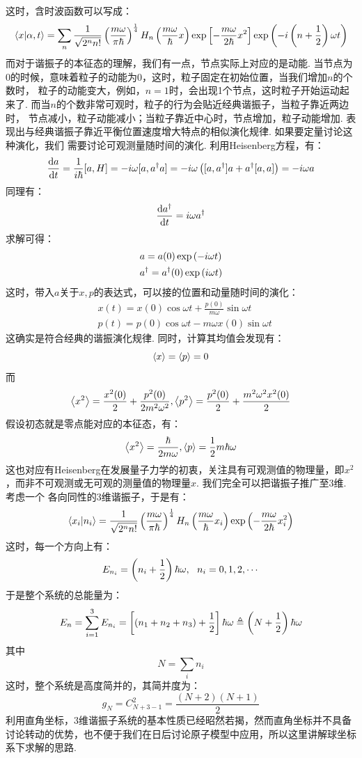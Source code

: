 这时，含时波函数可以写成：
\[
\bra{x}\ket{\alpha,t} = \sum_{n}\frac{1}{\sqrt{2^{n}n!}}\left({\frac{m\omega}{\pi\hbar}}\right)^{\frac{1}{4}}H_{n}\left({\frac{m\omega}{\hbar}x}\right)\exp\left[{-\frac{m\omega}{2\hbar}x^{2}}\right]\exp\left({-i\left({n+\frac{1}{2}}\right)\omega t}\right)
\]
而对于谐振子的本征态的理解，我们有一点，节点实际上对应的是动能. 当节点为0的时候，意味着粒子的动能为0，这时，粒子固定在初始位置，当我们增加\(n\)的个数时，
粒子的动能变大，例如，\(n=1\)时，会出现1个节点，这时粒子开始运动起来了. 而当\(n\)的个数非常可观时，粒子的行为会贴近经典谐振子，当粒子靠近两边时，
节点减小，粒子动能减小；当粒子靠近中心时，节点增加，粒子动能增加. 表现出与经典谐振子靠近平衡位置速度增大特点的相似演化规律. 如果要定量讨论这种演化，我们
需要讨论可观测量随时间的演化. 利用Heisenberg方程，有：
\[
\frac{\mathrm{d} a}{\mathrm{d}t} = \frac{1}{i\hbar}[a,H] = -i\omega[a,a^{\dagger}a] = -i\omega\left({[a,a^{\dagger}]a + a^{\dagger}[a,a]}\right) = -i\omega a
\]
同理有：
\[
\frac{\mathrm{d} a^{\dagger}}{\mathrm{d}t} = i\omega a^{\dagger}
\]
求解可得：
\begin{align*}
& a = a(0)\exp\left({-i\omega t}\right) \\
& a^{\dagger} = a^{\dagger}(0)\exp\left({i\omega t}\right)
\end{align*}
这时，带入\(a\)关于\(x,p\)的表达式，可以接的位置和动量随时间的演化：
\begin{align*}
& x(t) = x(0)\cos\omega t + \frac{p(0)}{m\omega}\sin\omega t \\
& p(t) = p(0)\cos\omega t - m\omega x(0)\sin\omega t
\end{align*}
这确实是符合经典的谐振演化规律. 同时，计算其均值会发现有：
\[
\left\langle{x}\right\rangle = \left\langle{p}\right\rangle = 0
\]
而
\[
\left\langle{x^2}\right\rangle =\frac{x^{2}(0)}{2}+\frac{p^{2}(0)}{2m^2\omega^2}, \left\langle{p^2}\right\rangle = \frac{p^{2}(0)}{2} + \frac{m^2\omega^2x^2(0)}{2}
\]
假设初态就是零点能对应的本征态，有：
\[
\left\langle{x^2}\right\rangle = \frac{\hbar}{2m\omega}, \left\langle{p}\right\rangle = \frac{1}{2}m\hbar\omega
\]
这也对应有Heisenberg在发展量子力学的初衷，关注具有可观测值的物理量，即\(x^2\)，而非不可观测或无可观的测量值的物理量\(x\). 我们完全可以把谐振子推广至3维. 考虑一个
各向同性的3维谐振子，于是有：
\[
\bra{x_{i}}\ket{n_{i}} = \frac{1}{\sqrt{2^{n}n!}}\left({\frac{m\omega}{\pi\hbar}}\right)^{\frac{1}{4}}H_{n}\left({\frac{m\omega}{\hbar}x_{i}}\right)\exp\left({-\frac{m\omega}{2\hbar}x_{i}^{2}}\right)
\]
这时，每一个方向上有：
\[
E_{n_{i}} = \left({n_{i}+\frac{1}{2}}\right)\hbar\omega,\ \ n_{i} = 0,1,2,\cdots
\]
于是整个系统的总能量为：
\[
E_{n} = \sum_{i=1}^{3}E_{n_{i}} = \left[{\left({n_{1}+n_{2}+n_{3}}\right)+\frac{1}{2}}\right]\hbar\omega\triangleq \left({N+\frac{1}{2}}\right)\hbar\omega
\]
其中
\[
N = \sum_{i}n_{i}
\]
这时，整个系统是高度简并的，其简并度为：
\[
g_{N} = C_{N+3-1}^{2} = \frac{(N+2)(N+1)}{2}
\]
利用直角坐标，3维谐振子系统的基本性质已经昭然若揭，然而直角坐标并不具备讨论转动的优势，也不便于我们在日后讨论原子模型中应用，所以这里讲解球坐标系下求解的思路. 
